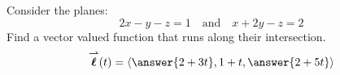 \documentclass{ximera}
\author{Bart Snapp}
\begin{document}
\begin{exercise}
Consider the planes:
\[
2x-y-z=1\quad\text{and}\quad x+2y-z=2
\]
Find a vector valued function that runs along their intersection.
\[
\vecl(t) = \vector{\answer{2+3t},1+t,\answer{2+5t}}
\]
\end{exercise}
\end{document}

